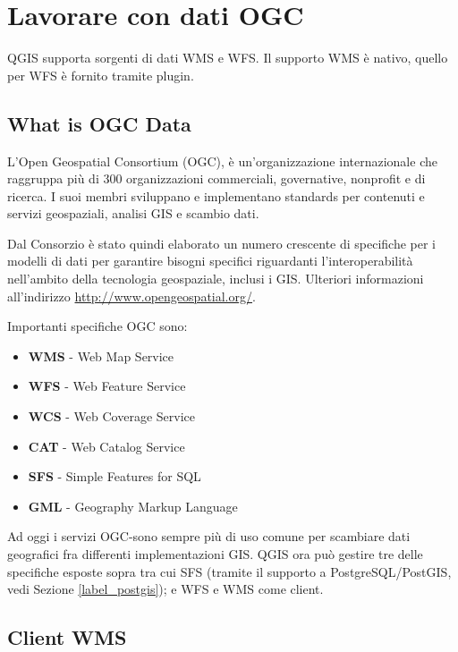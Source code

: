 
\section{Lavorare con dati OGC}


QGIS supporta sorgenti di dati WMS e WFS. Il supporto WMS è nativo, quello per
WFS è fornito tramite plugin.

\subsection{What is OGC Data}

L'Open Geospatial Consortium (OGC), è un’organizzazione internazionale che raggruppa più
di 300 organizzazioni commerciali, governative, nonprofit e di ricerca.
I suoi membri sviluppano e implementano standards per contenuti e servizi geospaziali,
analisi GIS e scambio dati.

Dal Consorzio è stato quindi elaborato un numero crescente di specifiche per i modelli di
dati per garantire bisogni specifici riguardanti l'interoperabilità
nell'ambito della tecnologia geospaziale, inclusi i GIS. Ulteriori
informazioni all'indirizzo \url{http://www.opengeospatial.org/}.

Importanti specifiche OGC sono:

\begin{itemize}
\item \textbf{WMS} - Web Map Service
\item \textbf{WFS} - Web Feature Service
\item \textbf{WCS} - Web Coverage Service
\item \textbf{CAT} - Web Catalog Service
\item \textbf{SFS} - Simple Features for SQL
\item \textbf{GML} - Geography Markup Language
\end{itemize}

Ad oggi i servizi OGC-sono sempre più di uso comune per scambiare dati geografici fra
differenti implementazioni GIS. QGIS ora può gestire tre delle specifiche esposte sopra
tra cui SFS (tramite il supporto a PostgreSQL/PostGIS, vedi Sezione
\ref{label_postgis}); e WFS e WMS come client.


\subsection{Client WMS}\label{sec:ogc-wms}

